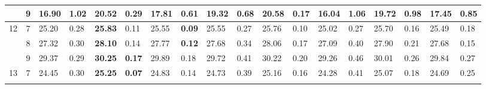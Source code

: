 \documentclass[conference]{IEEEtran}
\begin{document}
\begin{table}[t]
\begin{tabular}{|cc|ll|ll|ll|ll|ll|ll|ll|ll|}
		\multicolumn{1}{|c|}{}                    & 9          & \multicolumn{1}{l|}{16.90}         & 1.02                              & \multicolumn{1}{l|}{20.52}          & 0.29                              & \multicolumn{1}{l|}{17.81}         & 0.61                              & \multicolumn{1}{l|}{19.32}         & 0.68                              & \multicolumn{1}{l|}{\textbf{20.58}}       & \textbf{0.17} & \multicolumn{1}{l|}{16.04} & 1.06 & \multicolumn{1}{l|}{19.72}          & 0.98          & \multicolumn{1}{l|}{17.45} & 0.85 \\ \hline
		\multicolumn{1}{|c|}{\multirow{3}{*}{12}} & 7          & \multicolumn{1}{l|}{25.20}         & 0.28                              & \multicolumn{1}{l|}{\textbf{25.83}} & 0.11                              & \multicolumn{1}{l|}{25.55}         & \textbf{0.09}                     & \multicolumn{1}{l|}{25.55}         & 0.27                              & \multicolumn{1}{l|}{25.76}                & 0.10          & \multicolumn{1}{l|}{25.02} & 0.27 & \multicolumn{1}{l|}{25.70}          & 0.16          & \multicolumn{1}{l|}{25.49} & 0.18 \\ \cline{2-18} 
		\multicolumn{1}{|c|}{}                    & 8          & \multicolumn{1}{l|}{27.32}         & 0.30                              & \multicolumn{1}{l|}{\textbf{28.10}} & 0.14                              & \multicolumn{1}{l|}{27.77}         & \textbf{0.12}                     & \multicolumn{1}{l|}{27.68}         & 0.34                              & \multicolumn{1}{l|}{28.06}                & 0.17          & \multicolumn{1}{l|}{27.09} & 0.40 & \multicolumn{1}{l|}{27.90}          & 0.21          & \multicolumn{1}{l|}{27.68} & 0.15 \\ \cline{2-18} 
		\multicolumn{1}{|c|}{}                    & 9          & \multicolumn{1}{l|}{29.37}         & 0.29                              & \multicolumn{1}{l|}{\textbf{30.25}} & \textbf{0.17}                     & \multicolumn{1}{l|}{29.89}         & 0.18                              & \multicolumn{1}{l|}{29.72}         & 0.41                              & \multicolumn{1}{l|}{30.22}                & 0.20          & \multicolumn{1}{l|}{29.26} & 0.46 & \multicolumn{1}{l|}{30.01}          & 0.26          & \multicolumn{1}{l|}{29.84} & 0.27 \\ \hline
		\multicolumn{1}{|c|}{\multirow{3}{*}{13}} & 7          & \multicolumn{1}{l|}{24.45}         & 0.30                              & \multicolumn{1}{l|}{\textbf{25.25}} & \textbf{0.07}                     & \multicolumn{1}{l|}{24.83}         & 0.14                              & \multicolumn{1}{l|}{24.73}         & 0.39                              & \multicolumn{1}{l|}{25.16}                & 0.16          & \multicolumn{1}{l|}{24.28} & 0.41 & \multicolumn{1}{l|}{25.07}          & 0.18          & \multicolumn{1}{l|}{24.69} & 0.25 \\ \cline{2-18} 

\end{tabular}
\end{table}
\end{document}
